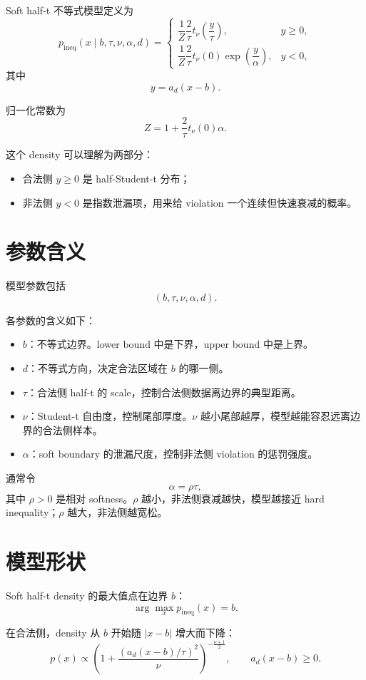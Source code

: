 \documentclass[11pt]{ctexart}
\begin{document}
Soft half-t 不等式模型定义为
\[
 p_{\mathrm{ineq}}(x\mid b,\tau,\nu,\alpha,d)
 =
 \begin{cases}
 \dfrac{1}{Z}\dfrac{2}{\tau}t_\nu\!\left(\dfrac{y}{\tau}\right),
 & y\ge 0,\\[1.2em]
 \dfrac{1}{Z}\dfrac{2}{\tau}t_\nu(0)\exp\!\left(\dfrac{y}{\alpha}\right),
 & y<0,
 \end{cases}
\]
其中
\[
 y=a_d(x-b).
\]

归一化常数为
\[
 Z = 1 + \frac{2}{\tau}t_\nu(0)\alpha.
\]

这个 density 可以理解为两部分：
\begin{itemize}[leftmargin=2em]
  \item 合法侧 $y\ge 0$ 是 half-Student-t 分布；
  \item 非法侧 $y<0$ 是指数泄漏项，用来给 violation 一个连续但快速衰减的概率。
\end{itemize}

\section{参数含义}

模型参数包括
\[
(b,\tau,\nu,\alpha,d).
\]

各参数的含义如下：
\begin{itemize}[leftmargin=2em]
  \item $b$：不等式边界。lower bound 中是下界，upper bound 中是上界。
  \item $d$：不等式方向，决定合法区域在 $b$ 的哪一侧。
  \item $\tau$：合法侧 half-t 的 scale，控制合法侧数据离边界的典型距离。
  \item $\nu$：Student-t 自由度，控制尾部厚度。$\nu$ 越小尾部越厚，模型越能容忍远离边界的合法侧样本。
  \item $\alpha$：soft boundary 的泄漏尺度，控制非法侧 violation 的惩罚强度。
\end{itemize}

通常令
\[
\alpha = \rho\tau,
\]
其中 $\rho>0$ 是相对 softness。$\rho$ 越小，非法侧衰减越快，模型越接近 hard inequality；$\rho$ 越大，非法侧越宽松。

\section{模型形状}

Soft half-t density 的最大值点在边界 $b$：
\[
\arg\max_x p_{\mathrm{ineq}}(x)=b.
\]

在合法侧，density 从 $b$ 开始随 $|x-b|$ 增大而下降：
\[
 p(x)\propto
 \left(1+\frac{(a_d(x-b)/\tau)^2}{\nu}\right)^{-\frac{\nu+1}{2}},
 \qquad a_d(x-b)\ge 0.
\]
\end{document}
